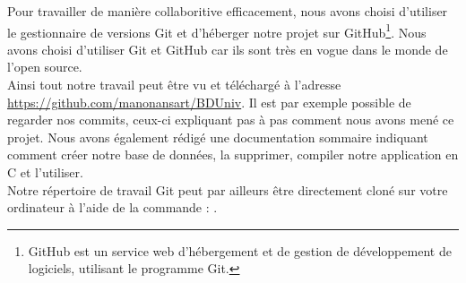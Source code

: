 Pour travailler de manière collaboritive efficacement, nous avons choisi d'utiliser le gestionnaire de versions Git et d'héberger notre projet sur GitHub\footnote{GitHub est un service web d'hébergement et de gestion de développement de logiciels, utilisant le programme Git.}. Nous avons choisi d'utiliser Git et GitHub car ils sont très en vogue dans le monde de l'open source.\\ 

Ainsi tout notre travail peut être vu et téléchargé à l'adresse \url{https://github.com/manonansart/BDUniv}. Il est par exemple possible de regarder nos commits, ceux-ci expliquant pas à pas comment nous avons mené ce projet. Nous avons également rédigé une documentation sommaire indiquant comment créer notre base de données, la supprimer, compiler notre application en C et l'utiliser.\\ 

Notre répertoire de travail Git peut par ailleurs être directement cloné sur votre ordinateur à l'aide de la commande : .